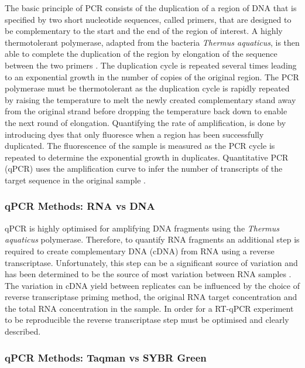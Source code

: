 \documentclass[../main.tex]{subfiles}
\begin{document}
The basic principle of PCR consists of the duplication of a region of DNA that is specified by two short nucleotide sequences, called primers, that are designed to be complementary to the start and the end of the region of interest. 
A highly thermotolerant polymerase, adapted from the bacteria \textit{Thermus aquaticus}, is then able to complete the duplication of the region by elongation of the sequence between the two primers \parencite{Saiki1988}.
The duplication cycle is repeated several times leading to an exponential growth in the number of copies of the original region.
The PCR polymerase must be thermotolerant as the duplication cycle is rapidly repeated by raising the temperature to melt the newly created complementary stand away from the original strand before dropping the temperature back down to enable the next round of elongation. 
Quantifying the rate of amplification, is done by introducing dyes that only fluoresce when a region has been successfully duplicated. 
The fluorescence of the sample is measured as the PCR cycle is repeated to determine the exponential growth in duplicates.
Quantitative PCR (qPCR) uses the amplification curve to infer the number of transcripts of the target sequence in the original sample \parencite{Holland1991}.

\subsubsection{qPCR Methods: RNA vs DNA}

qPCR is highly optimised for amplifying DNA fragments using the \textit{Thermus aquaticus} polymerase. 
Therefore, to quantify RNA fragments an additional step is required to create complementary DNA (cDNA) from RNA using a reverse transcriptase. 
Unfortunately, this step can be a significant source of variation and has been determined to be the source of most variation between RNA samples \parencite{Stahlberg2004}. 
The variation in cDNA yield between replicates can be influenced by the choice of reverse transcriptase priming method, the original RNA target concentration and the total RNA concentration in the sample. 
In order for a RT-qPCR experiment to be reproducible the reverse transcriptase step must be optimised and clearly described. 

\subsubsection{qPCR Methods: Taqman vs SYBR Green}
\end{document}
